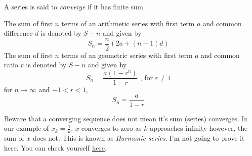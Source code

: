 \vspace{5mm}

\noindent A series is said to \textit{converge} if it has finite sum.

\vspace{5mm}

\noindent The sum of first $n$ terms of an arithmetic series with first term $a$ and common difference $d$ is denoted by $S-n$ and given by
\begin{equation}\label{eq5}
S_n = \frac{n}{2}(2a+(n-1)d)
\end{equation}
\noindent The sum of first $n$ terms of an geometric series with first term $a$ and common ratio $r$ is denoted by $S-n$ and given by
\begin{equation}\label{eq6}
S_n = \frac{a(1-r^n)}{1-r} \text{ , for } r \neq 1
\end{equation}
\noindent for $n \to \infty$ and $-1<r<1$,
\begin{equation}\label{eq7}
S_n = \frac{a}{1-r}
\end{equation}

\noindent Beware that a converging sequence does not mean it's sum (series) converges. In our example of $x_k = \frac{1}{k}$, $x$ converges to zero as $k$ approaches infinity however, the sum of $x$ does not. This is known as \textit{Harmonic series}. I'm not going to prove it here. You can check yourself \href{https://proofwiki.org/wiki/Harmonic_Series_is_Divergent}{here}.